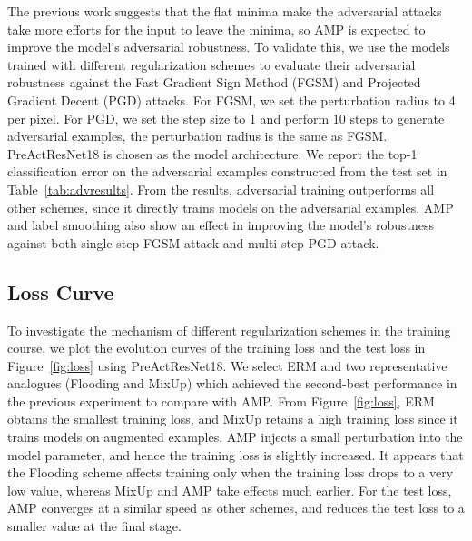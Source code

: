 \documentclass[final]{cvpr}
\begin{document}
The previous work \cite{zhao2020bridging} suggests that the flat minima make the adversarial attacks take more efforts for the input to leave the minima, so AMP is expected to improve the model's adversarial robustness. To validate this, we use the models trained with different regularization schemes to evaluate their adversarial robustness against the Fast Gradient Sign Method (FGSM) \cite{goodfellow2015explaining} and Projected Gradient Decent (PGD) \cite{madry2017towards} attacks. For FGSM, we set the perturbation radius to 4 per pixel. For PGD, we set the step size to 1 and perform 10 steps to generate adversarial examples, the perturbation radius is the same as FGSM. PreActResNet18 is chosen as the model architecture. We report the top-1 classification error on the adversarial examples constructed from the test set in Table~\ref{tab:advresults}. From the results, adversarial training outperforms all other schemes, since it directly trains models on the adversarial examples. AMP and label smoothing also show an effect in improving the model's robustness against both single-step FGSM attack and multi-step PGD attack.

\subsection{Loss Curve}

To investigate the mechanism of different regularization schemes in the training course, we plot the evolution curves of the training loss and the test loss in Figure~\ref{fig:loss} using PreActResNet18. We select ERM and two representative analogues (Flooding and MixUp) which achieved the second-best performance in the previous experiment to compare with AMP. From Figure~\ref{fig:loss}, ERM obtains the smallest training loss, and MixUp retains a high training loss since it trains models on augmented examples. AMP injects a small perturbation into the model parameter, and hence the training loss is slightly increased. It appears that the Flooding scheme affects training only when the training loss drops to a very low value, whereas MixUp and AMP take effects much earlier. For the test loss, AMP converges at a similar speed as other schemes, and reduces the test loss to a smaller value at the final stage.
\end{document}

